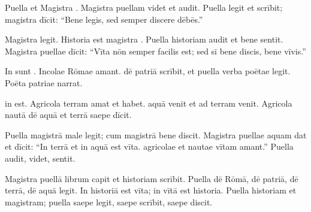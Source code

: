 \documentclass[12pt]{nextbook}
\begin{document}
\begin{readersection}{Puella et Magistra}
   . Magistra puellam videt et audit. Puella legit et scrībit; magistra dīcit: “Bene legis, sed semper discere dēbēs.”

Magistra  legit. Historia est magistra . Puella historiam audit et bene sentit. Magistra puellae dīcit: “Vīta nōn semper facilis est; sed sī bene discis, bene vīvis.”

In  sunt . Incolae Rōmae  amant.  dē patriā scrībit, et puella verba poētae legit. Poēta  patriae narrat.

 in  est. Agricola terram amat et  habet.   aquā venit et ad terram venit. Agricola  nautā dē aquā et terrā saepe dīcit.

Puella  magistrā male legit; cum magistrā bene discit. Magistra puellae aquam dat et dīcit: “In terrā et in aquā est vīta.  agricolae et nautae vītam amant.” Puella audit, videt, sentit.

Magistra  puellā librum capit et historiam scrībit. Puella dē Rōmā, dē patriā, dē terrā, dē aquā legit. In historiā est vīta; in vītā est historia. Puella  historiam et magistram; puella saepe legit, saepe scrībit, saepe discit.

\end{readersection}
\end{document}
